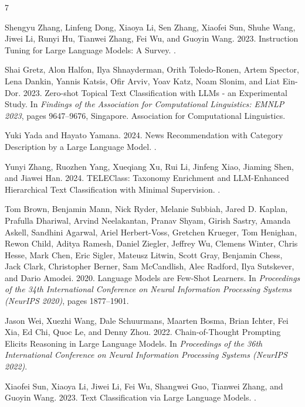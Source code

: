 \documentclass[sigconf,nonacm]{acmart}
\begin{document}

\begin{thebibliography}{7}

Shengyu Zhang, Linfeng Dong, Xiaoya Li, Sen Zhang, Xiaofei Sun, Shuhe Wang, Jiwei Li, Runyi Hu, Tianwei Zhang, Fei Wu, and Guoyin Wang. 2023.
\newblock Instruction Tuning for Large Language Models: A Survey.
.

Shai Gretz, Alon Halfon, Ilya Shnayderman, Orith Toledo-Ronen, Artem Spector, Lena Dankin, Yannis Katsis, Ofir Arviv, Yoav Katz, Noam Slonim, and Liat Ein-Dor. 2023.
\newblock Zero-shot Topical Text Classification with LLMs - an Experimental Study.
\newblock In {\em Findings of the Association for Computational Linguistics: EMNLP 2023}, pages 9647--9676, Singapore. Association for Computational Linguistics.

Yuki Yada and Hayato Yamana. 2024.
\newblock News Recommendation with Category Description by a Large Language Model.
.

Yunyi Zhang, Ruozhen Yang, Xueqiang Xu, Rui Li, Jinfeng Xiao, Jiaming Shen, and Jiawei Han. 2024.
\newblock TELEClass: Taxonomy Enrichment and LLM-Enhanced Hierarchical Text Classification with Minimal Supervision.
.

Tom Brown, Benjamin Mann, Nick Ryder, Melanie Subbiah, Jared D. Kaplan, Prafulla Dhariwal, Arvind Neelakantan, Pranav Shyam, Girish Sastry, Amanda Askell, Sandhini Agarwal, Ariel Herbert-Voss, Gretchen Krueger, Tom Henighan, Rewon Child, Aditya Ramesh, Daniel Ziegler, Jeffrey Wu, Clemens Winter, Chris Hesse, Mark Chen, Eric Sigler, Mateusz Litwin, Scott Gray, Benjamin Chess, Jack Clark, Christopher Berner, Sam McCandlish, Alec Radford, Ilya Sutskever, and Dario Amodei. 2020.
\newblock Language Models are Few-Shot Learners.
\newblock In {\em Proceedings of the 34th International Conference on Neural Information Processing Systems (NeurIPS 2020)}, pages 1877--1901.

Jason Wei, Xuezhi Wang, Dale Schuurmans, Maarten Bosma, Brian Ichter, Fei Xia, Ed Chi, Quoc Le, and Denny Zhou. 2022.
\newblock Chain-of-Thought Prompting Elicits Reasoning in Large Language Models.
\newblock In {\em Proceedings of the 36th International Conference on Neural Information Processing Systems (NeurIPS 2022)}.

Xiaofei Sun, Xiaoya Li, Jiwei Li, Fei Wu, Shangwei Guo, Tianwei Zhang, and Guoyin Wang. 2023.
\newblock Text Classification via Large Language Models.
.

\end{thebibliography}
\end{document}
